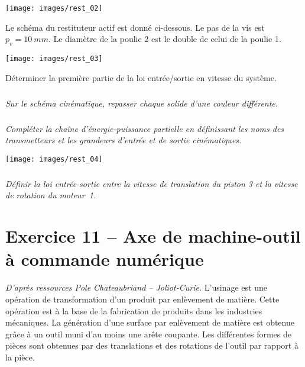 \documentclass[10pt,fleqn]{article} %
\begin{document}
\begin{multicols}{2}
\begin{center}
\texttt{[image: images/rest\_02]}
\end{center}

Le schéma du restituteur actif est donné ci-dessous. Le pas de la vis est $p_v =\SI{10}{mm}$.
Le diamètre de la poulie 2 est le double de celui de la poulie 1. 


\begin{center}
\texttt{[image: images/rest\_03]}
\end{center}

\begin{obj}
Déterminer la première partie
de la loi entrée/sortie en vitesse du
système.
\end{obj}

\subparagraph{}
\textit{Sur le schéma cinématique, repasser chaque solide d’une couleur différente.}

\ifprof
\begin{corrige}
\end{corrige}
\else
\fi

\subparagraph{}
\textit{Compléter la chaîne d’énergie-puissance partielle en définissant les noms des transmetteurs et les grandeurs
d’entrée et de sortie cinématiques.}

\ifprof
\begin{corrige}
\end{corrige}
\else
\fi



\begin{center}
\texttt{[image: images/rest\_04]}
\end{center}

\subparagraph{}
\textit{Définir la loi entrée-sortie entre la vitesse de translation du piston 3 et la vitesse de rotation du moteur~1. }

\ifprof
\begin{corrige}
\end{corrige}
\else
\fi


\section*{Exercice 11 -- Axe de machine-outil à commande numérique}
\textit{D'après ressources Pole Chateaubriand -- Joliot-Curie.}
\setcounter{exo}{0}
L’usinage est une opération de transformation d’un produit par enlèvement de matière.
Cette opération est à la base de la fabrication de produits dans les industries mécaniques.
La génération d’une surface par enlèvement de matière est obtenue grâce à un outil muni
d’au moins une arête coupante. Les différentes formes de pièces sont obtenues par des
translations et des rotations de l'outil par rapport à la pièce.


\end{multicols}
\end{document}
